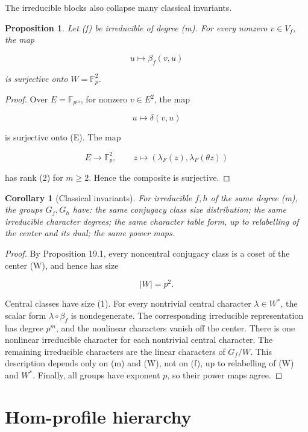 \documentclass[11pt]{article}
\newtheorem{proposition}[theorem]{Proposition}
\newtheorem{corollary}[theorem]{Corollary}
\begin{document}
The irreducible blocks also collapse many classical invariants.

\begin{proposition}
Let (f) be irreducible of degree (m). For every nonzero $v\in V_f$, the map

\[
u\mapsto \beta_f(v,u)
\]

is surjective onto $W=\mathbb F_p^2$.

\end{proposition}

\begin{proof}
Over $E=\mathbb F_{p^m}$, for nonzero $v\in E^2$, the map

\[
u\mapsto \delta(v,u)
\]

is surjective onto (E). The map

\[
E\to \mathbb F_p^2,
\qquad
z\mapsto
(\lambda_F(z),\lambda_F(\theta z))
\]

has rank (2) for $m\ge2$. Hence the composite is surjective.

\end{proof}

\begin{corollary}[Classical invariants]
For irreducible $f,h$ of the same degree (m), the groups $G_f,G_h$ have: the same conjugacy class size distribution; the same irreducible character degrees; the same character table form, up to relabelling of the center and its dual; the same power maps.

\end{corollary}

\begin{proof}
By Proposition 19.1, every noncentral conjugacy class is a coset of the center (W), and hence has size

\[
|W|=p^2.
\]

Central classes have size (1). For every nontrivial central character $\lambda\in W^*$, the scalar form $\lambda\circ\beta_f$ is nondegenerate. The corresponding irreducible representation has degree $p^m$, and the nonlinear characters vanish off the center. There is one nonlinear irreducible character for each nontrivial central character. The remaining irreducible characters are the linear characters of $G_f/W$. This description depends only on (m) and (W), not on (f), up to relabelling of (W) and $W^*$. Finally, all groups have exponent $p$, so their power maps agree.

\end{proof}

\section{Hom-profile hierarchy}
\end{document}
